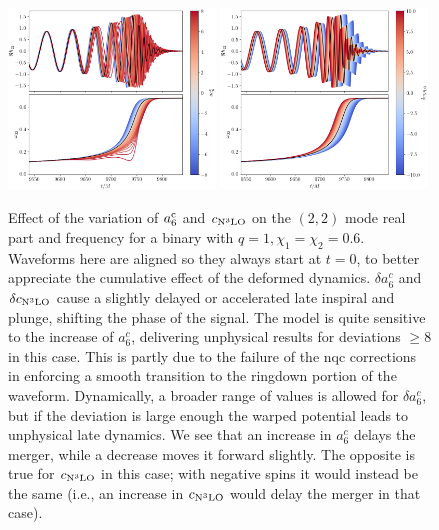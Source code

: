\documentclass[prd,amssymb,amsmath,amsfonts,nofootinbib,reprint,showpacs,longbibliography]{revtex4-1}
\def\c3{c_{\rm{N}^3\rm{LO}}}
\begin{document}
\begin{figure}
    \includegraphics[width=0.49\textwidth]{figs/delta_a6c_-8.0_8.0.png}
    \includegraphics[width=0.49\textwidth]{figs/delta_cN3LO_-10.0_10.0.png}
    \caption{\label{fig:a6c3}
    Effect of the variation of $a_6^{\rm c}$ and $\c3$ on the $(2,2)$ mode real part and frequency
    for a binary with $q = 1, \chi_1 = \chi_2 = 0.6$. Waveforms here are aligned so they always start at $t = 0$,
    to better appreciate the cumulative effect of the deformed dynamics. $\delta a_6^c$ and $\delta \c3$ cause a slightly
    delayed or accelerated late inspiral and plunge, shifting the phase of the signal. The model is quite
    sensitive to the increase of $a_6^c$, delivering unphysical results for deviations $\geq 8$ in this case.
    This is partly due to the failure of the \ac{nqc} corrections in enforcing a smooth transition to the ringdown
    portion of the waveform. Dynamically, a broader range of values is allowed for $\delta a_{6}^c$, but
    if the deviation is large enough the warped potential leads to unphysical late dynamics.
    We see that an increase in $a_6^c$ delays the merger, while a decrease moves it forward slightly. The
    opposite is true for $\c3$ in this case; with negative spins it would instead be the same (i.e.,
    an increase in $\c3$ would delay the merger in that case).}
\end{figure}
\end{document}
